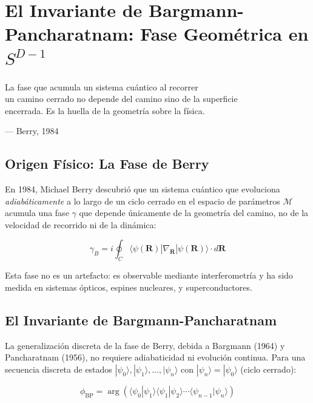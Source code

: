 \chapter{El Invariante de Bargmann-Pancharatnam: Fase Geométrica en $S^{D-1}$}
\label{ch:bargmann}

\epigraph{La fase que acumula un sistema cuántico al recorrer\\
un camino cerrado no depende del camino sino de la superficie\\
encerrada. Es la huella de la geometría sobre la física.}{--- Berry, 1984}

\section{Origen Físico: La Fase de Berry}

En 1984, Michael Berry descubrió que un sistema cuántico que evoluciona
\textit{adiabáticamente} a lo largo de un ciclo cerrado en el espacio de
parámetros $\mathcal{M}$ acumula una fase $\gamma$ que depende únicamente
de la geometría del camino, no de la velocidad de recorrido ni de la dinámica:

\begin{equation}
\gamma_B = i \oint_C \langle \psi(\mathbf{R}) | \nabla_{\mathbf{R}} | \psi(\mathbf{R}) \rangle \cdot d\mathbf{R}
\label{eq:berry_phase}
\end{equation}

Esta fase no es un artefacto: es observable mediante interferometría y ha sido
medida en sistemas ópticos, espines nucleares, y superconductores.

\section{El Invariante de Bargmann-Pancharatnam}

La generalización discreta de la fase de Berry, debida a Bargmann (1964) y
Pancharatnam (1956), no requiere adiabaticidad ni evolución continua. Para una
secuencia discreta de estados $|\psi_0\rangle, |\psi_1\rangle, \ldots, |\psi_n\rangle$
con $|\psi_n\rangle = |\psi_0\rangle$ (ciclo cerrado):

\begin{equation}
\phi_{\text{BP}} = \arg\left(\langle\psi_0|\psi_1\rangle \langle\psi_1|\psi_2\rangle \cdots \langle\psi_{n-1}|\psi_n\rangle\right)
\label{eq:bargmann_pancharatnam}
\end{equation}


